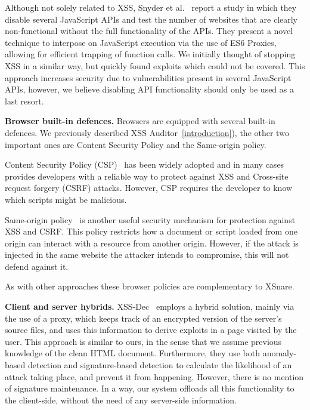 Although not solely related to \ac{XSS}, Snyder et
al.~\cite{Snyder:2017:MWD:3133956.3133966} report a study in which
they disable several JavaScript APIs and test the number of websites
that are clearly non-functional without the full functionality of the
APIs. They present a novel technique to interpose on JavaScript
execution via the use of ES6 Proxies, allowing for efficient trapping
of function calls. We initially thought of stopping XSS in a similar
way, but quickly found exploits which could not be covered. This
approach increases security due to vulnerabilities present in several
JavaScript APIs, however, we believe disabling API functionality
should only be used as a last resort.

\noindent \textbf{Browser built-in defences.}  Browsers are equipped
with several built-in defences. We previously described XSS
Auditor~\ref{introduction}), the other two important ones are Content
Security Policy and the Same-origin policy.

Content Security Policy (CSP)~\cite{CSP} has been widely adopted and
in many cases provides developers with a reliable way to protect
against \ac{XSS} and Cross-site request forgery (CSRF)
attacks. However, CSP requires the developer to know which scripts
might be malicious.

Same-origin policy~\cite{SOP} is another useful security mechanism for
protection against \ac{XSS} and CSRF. This policy restricts how a
document or script loaded from one origin can interact with a resource
from another origin. However, if the attack is injected in the same
website the attacker intends to compromise, this will not defend
against it.

As with other approaches these browser policies are complementary to
XSnare.

\noindent \textbf{Client and server hybrids.}
XSS-Dec~\cite{Sundareswaran:2012:XHS:2352970.2352994} employs a hybrid
solution, mainly via the use of a proxy, which keeps track of an
encrypted version of the server's source files, and uses this
information to derive exploits in a page visited by the user. This
approach is similar to ours, in the sense that we assume previous
knowledge of the clean HTML document. Furthermore, they use both
anomaly-based detection and signature-based detection to calculate the
likelihood of an attack taking place, and prevent it from
happening. However, there is no mention of signature maintenance. In a
way, our system offloads all this functionality to the client-side,
without the need of any server-side information.

